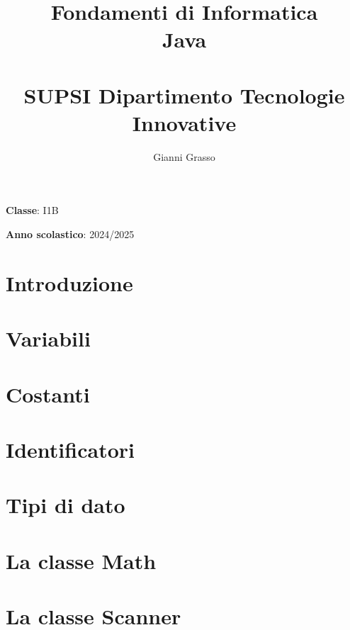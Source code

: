 \documentclass{article}
\title{
    Fondamenti di Informatica \\
    Java \\
    \phantom{}\\
    \large SUPSI Dipartimento Tecnologie Innovative
}
\author{Gianni Grasso}
\begin{document}
\maketitle
\hphantom{ }
\vspace{14.5cm}

\textbf{Classe}: I1B

\textbf{Anno scolastico}: 2024/2025
\pagebreak


\tableofcontents
\pagebreak

\section{Introduzione}

\pagebreak

\section{Variabili}

\pagebreak

\section{Costanti}

\pagebreak

\section{Identificatori}

\pagebreak

\section{Tipi di dato}

\pagebreak

\section{La classe Math}

\pagebreak

\section{La classe Scanner}

\pagebreak
\end{document}
